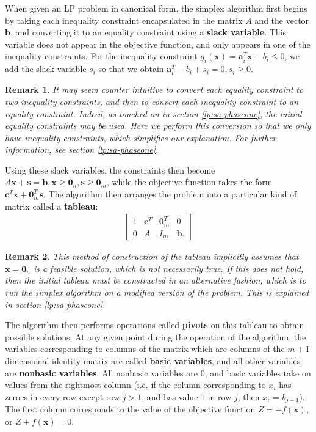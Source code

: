 \documentclass[10pt]{article}
\renewcommand{\vec}[1]{\mathbf{#1}}
\newcommand{\s}{\vec{s}}
\newcommand{\x}{\vec{x}}
\newcommand{\vz}[1]{\vec{0}_{#1}}
\renewcommand{\a}{\vec{a}}
\renewcommand{\b}{\vec{b}}
\renewcommand{\c}{\vec{c}}
\newtheorem*{remark}{Remark}
\begin{document}
When given an LP problem in canonical form, the simplex algorithm first begins by taking each inequality constraint encapsulated in the matrix $A$ and the vector $\b$, and converting it to an equality constraint using a \textbf{slack variable}. This variable does not appear in the objective function, and only appears in one of the inequality constraints. For the inequality constraint $g_i(\x) = \a_i^T\x - b_i\leq 0$, we add the slack variable $s_i$ so that we obtain $\a_i^T-b_i + s_i = 0, s_i\geq 0$. 
\begin{remark}
	It may seem counter intuitive to convert each equality constraint to two inequality constraints, and then to convert each inequality constraint to an equality constraint. Indeed, as touched on in section \ref{lp:sa-phaseone}, the initial equality constraints may be used. Here we perform this conversion so that we only have inequality constraints, which simplifies our explanation. For further information, see section \ref{lp:sa-phaseone}.
\end{remark}
Using these slack variables, the constraints then become $A\x + \s = \b, \x\geq \vz{n}, \s\geq \vz{m}$, while the objective function takes the form $\c^T\x + \vz{m}^T\s$. The algorithm then arranges the problem into a particular kind of matrix called a \textbf{tableau}:
\begin{align}
\label{lp:sa-tableau}
\begin{bmatrix}
1 & \c^T & \vz{m}^T & 0\\
0 & A & I_m & \b. 
\end{bmatrix}
\end{align}
\begin{remark}
	This method of construction of the tableau implicitly assumes that $\x=\vz{n}$ is a feasible solution, which is not necessarily true. If this does not hold, then the initial tableau must be constructed in an alternative fashion, which is to run the simplex algorithm on a modified version of the problem. This is explained in section \ref{lp:sa-phaseone}.
\end{remark}
The algorithm then performs operations called \textbf{pivots} on this tableau to obtain possible solutions\cite{dantzig-intro}. At any given point during the operation of the algorithm, the variables corresponding to columns of the matrix which are columns of the $m+1$ dimensional identity matrix are called \textbf{basic variables}, and all other variables are \textbf{nonbasic variables}. All nonbasic variables are 0, and basic variables take on values from the rightmost column (i.e. if the column corresponding to $x_i$ has zeroes in every row except row $j>1$, and has value $1$ in row $j$, then $x_i$ = $b_{j-1}$). The first column corresponds to the value of the objective function $Z = -f(\x)$, or $Z+f(\x) = 0$.
\end{document}
